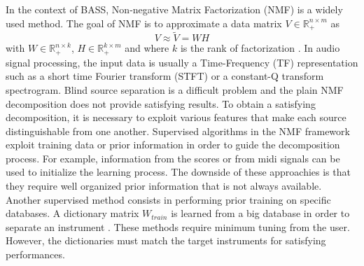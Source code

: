 \documentclass{article}
\begin{document}
In the context of BASS, Non-negative Matrix Factorization (NMF) is a widely used method. The goal of NMF is to approximate a data matrix $V \in \mathbb{R}_{+}^{n \times m} $ as 
\begin{equation}\label{modelNMF}
V \approx \tilde{V} = WH
\end{equation}
with $W \in \mathbb{R}_{+}^{n \times k}$, $H \in \mathbb{R}_{+}^{k \times m}$ and where $k$ is the rank of factorization \cite{lee99}. In audio signal processing, the input data is usually a Time-Frequency (TF) representation such as a short time Fourier transform (STFT) or a constant-Q transform spectrogram. Blind source separation is a difficult problem and the plain NMF decomposition does not provide satisfying results. To obtain a satisfying decomposition, it is necessary to exploit various features that make each source distinguishable from one another. 
Supervised algorithms in the NMF framework exploit training data or prior information in order to guide the decomposition process. For example, information from the scores or from midi signals \cite{EwertM12} can be used to initialize the learning process. The downside of these approachies is that they require well organized prior information that is not always available. Another supervised method consists in performing prior training on specific databases. A dictionary matrix $W_{train}$ is learned from a big database in order to separate an instrument \cite{jaureguiberry2011adaptation,wudrum}. These methods require minimum tuning from the user. However, the dictionaries must match the target instruments for satisfying performances. 
\end{document}
